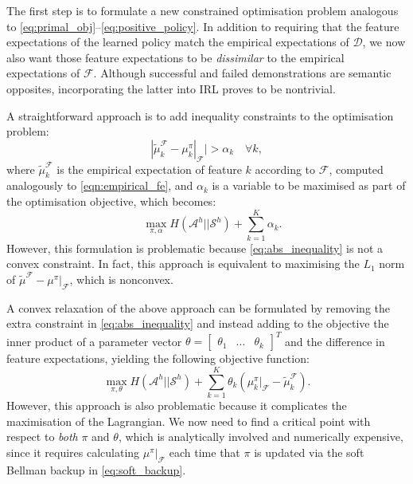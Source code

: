 \documentclass[letterpaper]{article}
\begin{document}
The first step is to formulate a new constrained optimisation problem analogous to \eqref{eq:primal_obj}--\eqref{eq:positive_policy}. In addition to requiring that the feature expectations of the learned policy match the empirical expectations of $\mathcal{D}$, we now also want those feature expectations to be \emph{dissimilar} to the empirical expectations of $\mathcal{F}$. Although successful and failed demonstrations are semantic opposites, incorporating the latter into IRL proves to be nontrivial.

A straightforward approach is to add inequality constraints to the optimisation problem:
	\begin{equation}
        \label{eq:abs_inequality}
	|\widetilde{\mu}^{\mathcal{F}}_k  - \mu^{\pi}_k|_{\mathcal{F}}| > \alpha_k \quad\forall k,
	\end{equation} 
where $\widetilde{\mu}^{\mathcal{F}}_k$ is the empirical expectation of feature $k$ according to $\mathcal{F}$, computed analogously to \eqref{eqn:empirical_fe}, and $\alpha_k$ is a variable to be maximised as part of the optimisation objective, which becomes:
	\begin{equation}
		\quad\max\limits_{\pi,\alpha} H(\mathcal{A}^h||\mathcal{S}^h) + \sum^K_{k=1} \alpha_k.
	\end{equation}
However, this formulation is problematic because \eqref{eq:abs_inequality} is not a convex constraint. In fact, this approach is equivalent to maximising the $L_1$ norm of $\widetilde{\mu}^{\mathcal{F}}  - \mu^{\pi}|_{\mathcal{F}}$, which is nonconvex.

A convex relaxation of the above approach can be formulated by removing the extra constraint in \eqref{eq:abs_inequality} and instead adding to the objective the inner product of a parameter vector $\theta=\left[\begin{array}{ccc}\theta_1 & \ldots & \theta_k\end{array}\right]^T$ and the difference in feature expectations, yielding the following objective function:
	\begin{equation}
		\max\limits_{\pi,\theta} H(\mathcal{A}^h||\mathcal{S}^h) + \sum^K_{k=1} \theta_k (\mu^{\pi}_k|_{\mathcal{F}} - \widetilde{\mu}^{\mathcal{F}}_k).
	\end{equation}
However, this approach is also problematic because it complicates the maximisation of the Lagrangian. We now need to find a critical point with respect to \emph{both} $\pi$ and $\theta$, which is analytically involved and numerically expensive, since it requires calculating $\mu^{\pi}|_{\mathcal{F}}$ each time that $\pi$ is updated via the soft Bellman backup in \eqref{eq:soft_backup}.
\end{document}
